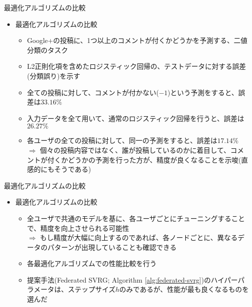 \documentclass[dvipdfmx,notheorems,t]{beamer}
\begin{document}
\begin{frame}{最適化アルゴリズムの比較}

\begin{itemize}
	\item 最適化アルゴリズムの比較
	\begin{itemize}
		\item Google+の投稿に、1つ以上のコメントが付くかどうかを予測する、二値分類のタスク
		\item L2正則化項を含めたロジスティック回帰の、テストデータに対する誤差(分類誤り)を示す
		\newline
		
		\item 全ての投稿に対して、コメントが付かない($-1$)という予測をすると、誤差は$33.16\%$
		\item 入力データを全て用いて、通常のロジスティック回帰を行うと、誤差は$26.27\%$
		\item 各ユーザの全ての投稿に対して、同一の予測をすると、誤差は$17.14\%$ \\
		$\Rightarrow$ 個々の投稿内容ではなく、誰が投稿しているのかに着目して、コメントが付くかどうかの予測を行った方が、精度が良くなることを示唆(直感的にもそうである)
	\end{itemize}
\end{itemize}

\end{frame}

\begin{frame}{最適化アルゴリズムの比較}

\begin{itemize}
	\item 最適化アルゴリズムの比較
	\begin{itemize}
		\item 全ユーザで共通のモデルを基に、各ユーザごとにチューニングすることで、精度を向上させられる可能性 \\
		$\Rightarrow$ もし精度が大幅に向上するのであれば、各ノードごとに、異なるデータのパターンが出現していることも確認できる
		\newline
		
		\item 各最適化アルゴリズムでの性能比較を行う
		\item 提案手法(Federated SVRG; Algorithm \ref{alg:federated-svrg})のハイパーパラメータは、ステップサイズ$h$のみであるが、性能が最も良くなるものを選んだ
	\end{itemize}
\end{itemize}

\end{frame}
\end{document}
